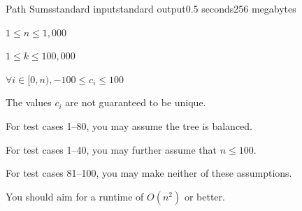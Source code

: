 \begin{problem}{Path Sums}{standard input}{standard output}{0.5 seconds}{256 megabytes}
\Example

\begin{example}
%
\end{example}

\Note
$1 \leq n \leq 1,000$

$1 \leq k \leq 100,000$

$\forall i \in [0, n), -100 \leq c_i \leq 100$

The values $c_i$ are not guaranteed to be unique.

For test cases 1--80, you may assume the tree is balanced.

For test cases 1--40, you may further assume that $n \leq 100$.

For test cases 81--100, you may make neither of these assumptions.

You should aim for a runtime of $O(n^2)$ or better.

\end{problem}

